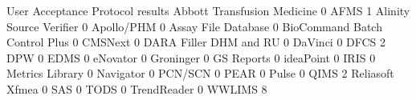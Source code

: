 \documentclass{article}
\begin{document}
\begin{Schunk}
\begin{Soutput}
                                User Acceptance Protocol results
  Abbott Transfusion Medicine                                  0
  AFMS                                                         1
  Alinity Source Verifier                                      0
  Apollo/PHM                                                   0
  Assay File Database                                          0
  BioCommand Batch Control Plus                                0
  CMSNext                                                      0
  DARA Filler DHM and RU                                       0
  DaVinci                                                      0
  DFCS                                                         2
  DPW                                                          0
  EDMS                                                         0
  eNovator                                                     0
  Groninger                                                    0
  GS Reports                                                   0
  ideaPoint                                                    0
  IRIS                                                         0
  Metrics Library                                              0
  Navigator                                                    0
  PCN/SCN                                                      0
  PEAR                                                         0
  Pulse                                                        0
  QIMS                                                         2
  Reliasoft Xfmea                                              0
  SAS                                                          0
  TODS                                                         0
  TrendReader                                                  0
  WWLIMS                                                       8
                               

\end{Soutput}
\end{Schunk}
\end{document}
